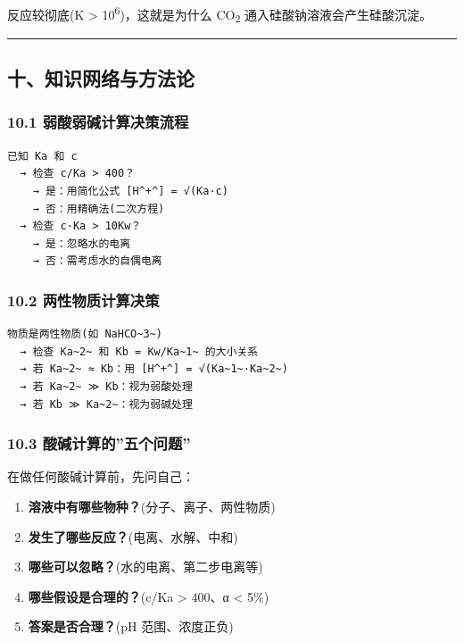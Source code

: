 反应较彻底(K \textgreater{} 10\textsuperscript{6})，这就是为什么 CO\textsubscript{2} 通入硅酸钠溶液会产生硅酸沉淀。

\begin{center}\rule{0.5\linewidth}{0.5pt}\end{center}

\subsection{十、知识网络与方法论}\label{ux5341ux77e5ux8bc6ux7f51ux7edcux4e0eux65b9ux6cd5ux8bba}

\subsubsection{10.1 弱酸弱碱计算决策流程}\label{ux5f31ux9178ux5f31ux78b1ux8ba1ux7b97ux51b3ux7b56ux6d41ux7a0b}

\begin{verbatim}
已知 Ka 和 c
  → 检查 c/Ka > 400？
    → 是：用简化公式 [H^+^] = √(Ka·c)
    → 否：用精确法(二次方程)
  → 检查 c·Ka > 10Kw？
    → 是：忽略水的电离
    → 否：需考虑水的自偶电离
\end{verbatim}

\subsubsection{10.2 两性物质计算决策}\label{ux4e24ux6027ux7269ux8d28ux8ba1ux7b97ux51b3ux7b56}

\begin{verbatim}
物质是两性物质(如 NaHCO~3~)
  → 检查 Ka~2~ 和 Kb = Kw/Ka~1~ 的大小关系
  → 若 Ka~2~ ≈ Kb：用 [H^+^] = √(Ka~1~·Ka~2~)
  → 若 Ka~2~ ≫ Kb：视为弱酸处理
  → 若 Kb ≫ Ka~2~：视为弱碱处理
\end{verbatim}

\subsubsection{10.3 酸碱计算的''五个问题''}\label{ux9178ux78b1ux8ba1ux7b97ux7684ux4e94ux4e2aux95eeux9898}

在做任何酸碱计算前，先问自己：

\begin{enumerate}
\def\labelenumi{\arabic{enumi}.}
\tightlist
\item
  \textbf{溶液中有哪些物种？}(分子、离子、两性物质)
\item
  \textbf{发生了哪些反应？}(电离、水解、中和)
\item
  \textbf{哪些可以忽略？}(水的电离、第二步电离等)
\item
  \textbf{哪些假设是合理的？}(c/Ka \textgreater{} 400、α \textless{} 5\%)
\item
  \textbf{答案是否合理？}(pH 范围、浓度正负)
\end{enumerate}

